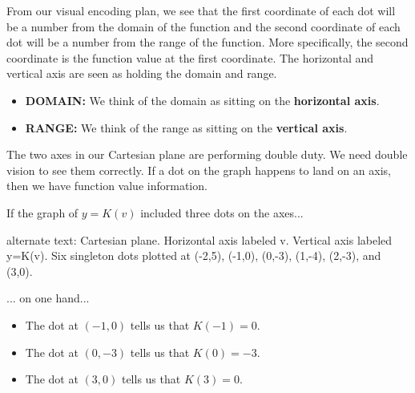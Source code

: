 \documentclass{ximera}
\begin{document}
From our visual encoding plan, we see that the first coordinate of each dot will be a number from the domain of the function and the second coordinate of each dot will be a number from the range of the function.  More specifically, the second coordinate is the function value at the first coordinate.  The horizontal and vertical axis are seen as holding the domain and range.

\begin{itemize}
\item \textbf{\textcolor{blue!55!black}{DOMAIN:}} We think of the domain as sitting on the \textbf{\textcolor{blue!55!black}{horizontal axis}}.
\item \textbf{\textcolor{purple!30!blue}{RANGE:}} We think of the range as sitting on the \textbf{\textcolor{purple!30!blue}{vertical axis}}.
\end{itemize}


The two axes in our Cartesian plane are performing double duty.  We need double vision to see them correctly. If a dot on the graph happens to land on an axis, then we have function value information.

If the graph of $y=K(v)$ included three dots on the axes...

\begin{image}
\end{image}


\textcolor{gray!90}{alternate text: Cartesian plane. Horizontal axis labeled v. Vertical axis labeled y=K(v). Six singleton dots plotted at (-2,5), (-1,0), (0,-3), (1,-4), (2,-3), and (3,0).}


... on one hand...

\begin{itemize}
\item The dot at $(-1,0)$ tells us that $K(-1) = 0$.
\item The dot at $(0,-3)$ tells us that $K(0) = -3$.
\item The dot at $(3,0)$ tells us that $K(3) = 0$.
\end{itemize}
\end{document}
